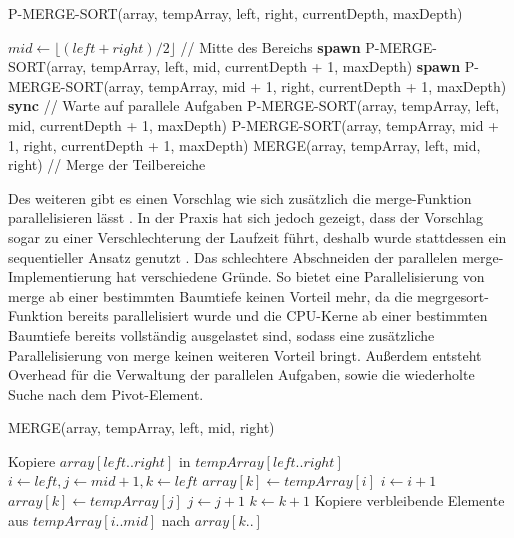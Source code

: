 \documentclass[fontsize=12pt,paper=a4,twoside=semi,parskip=half-,headsepline,headinclude]{scrreprt}
\begin{document}
\begin{algorithm}[H]
	\caption{P-MERGE-SORT(array, tempArray, left, right, currentDepth, maxDepth)}
	\begin{algorithmic}[1]
		\RETURN
		\ENDIF
		\STATE $mid \gets \lfloor (left + right) / 2 \rfloor$ \hfill // Mitte des Bereichs
		\STATE \textbf{spawn} P-MERGE-SORT(array, tempArray, left, mid, currentDepth + 1, maxDepth)
		\STATE \textbf{spawn} P-MERGE-SORT(array, tempArray, mid + 1, right, currentDepth + 1, maxDepth)
		\STATE \textbf{sync} \hfill // Warte auf parallele Aufgaben
		\ELSE
		\STATE P-MERGE-SORT(array, tempArray, left, mid, currentDepth + 1, maxDepth)
		\STATE P-MERGE-SORT(array, tempArray, mid + 1, right, currentDepth + 1, maxDepth)
		\ENDIF
		\STATE MERGE(array, tempArray, left, mid, right) \hfill // Merge der Teilbereiche
	\end{algorithmic}
\end{algorithm}

Des weiteren gibt  es einen Vorschlag wie sich zusätzlich die merge-Funktion parallelisieren lässt \cite[S. 776-782]{Cormen2022}. In der Praxis hat sich jedoch gezeigt, dass der Vorschlag sogar zu einer Verschlechterung der Laufzeit führt, deshalb wurde stattdessen ein sequentieller Ansatz genutzt \cite[S. 36]{Cormen2022}. Das schlechtere Abschneiden der parallelen merge-Implementierung hat verschiedene Gründe. So bietet eine Parallelisierung von merge ab einer bestimmten Baumtiefe keinen Vorteil mehr, da die megrgesort-Funktion bereits parallelisiert wurde und  die CPU-Kerne ab einer bestimmten Baumtiefe bereits vollständig ausgelastet sind, sodass eine zusätzliche Parallelisierung von merge keinen weiteren Vorteil bringt. Außerdem entsteht Overhead für die Verwaltung der parallelen Aufgaben, sowie die wiederholte Suche nach dem Pivot-Element.

\begin{algorithm}[H]
	\caption{MERGE(array, tempArray, left, mid, right)}
	\begin{algorithmic}[1]
		\STATE Kopiere $array[left..right]$ in $tempArray[left..right]$
		\STATE $i \gets left, j \gets mid + 1, k \gets left$
		\STATE $array[k] \gets tempArray[i]$
		\STATE $i \gets i + 1$
		\ELSE
		\STATE $array[k] \gets tempArray[j]$
		\STATE $j \gets j + 1$
		\ENDIF
		\STATE $k \gets k + 1$
		\ENDWHILE
		\STATE Kopiere verbleibende Elemente aus $tempArray[i..mid]$ nach $array[k..]$
	\end{algorithmic}
\end{algorithm}
\end{document}
